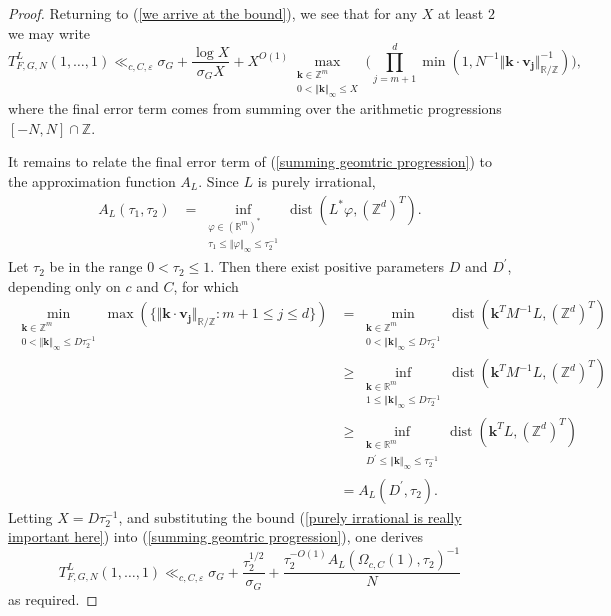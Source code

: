 \documentclass[12pt,a4paper,twoside,reqno]{amsart}
\newcommand{\dist}{\operatorname{dist}}
\numberwithin{equation}{section}
\begin{document}
\begin{proof}
Returning to (\ref{we arrive at the bound}), we see that for any $X$ at least $2$ we may write 
\begin{equation}
\label{summing geomtric progression}
T_{F,G,N}^L(1,\dots,1) \ll_{c,C,\varepsilon} \sigma_G + \frac{\log X}{\sigma_G X} + X^{O(1)}\max\limits_{\substack{\mathbf{k} \in \mathbb{Z}^m \\ 0<\Vert \mathbf{k} \Vert_\infty \leqslant X}}\Big( \prod\limits_{j=m+1}^d \min (1,  N^{-1}\Vert \mathbf{k} \cdot \mathbf{v_j}\Vert^{-1}_{\mathbb{R}/\mathbb{Z}})\Big),
\end{equation} where the final error term comes from summing over the arithmetic progressions $[-N,N] \cap \mathbb{Z}$.

It remains to relate the final error term of (\ref{summing geomtric progression}) to the approximation function $A_L$. Since $L$ is purely irrational, 
\begin{align}
A_L(\tau_1,\tau_2) &=\inf\limits_{\substack{\varphi \in (\mathbb{R}^m)^*\\ \tau_1 \leqslant  \Vert \varphi \Vert_\infty \leqslant \tau_2^{-1}} } \dist (L^* \varphi, (\mathbb{Z}^d)^T )\nonumber.
\end{align}
\noindent Let $\tau_2$ be in the range $0 < \tau_2 \leqslant 1$. Then there exist positive parameters $D$ and $D^\prime$, depending only on $c$ and $C$, for which
\begin{align}
\label{purely irrational is really important here}
\min\limits_{\substack{ \mathbf{k} \in \mathbb{Z}^m \\ 0< \Vert \mathbf{k}\Vert_\infty \leqslant D\tau_2^{-1}}} \max( \{\Vert \mathbf{k}\cdot\mathbf{v_j}\Vert_{\mathbb{R}/\mathbb{Z}}: m+1\leqslant j\leqslant d\}) & = \min\limits_{\substack{ \mathbf{k} \in \mathbb{Z}^m \\ 0< \Vert \mathbf{k}\Vert_\infty \leqslant D\tau_2^{-1}}} \dist(\mathbf{k}^T M^{-1} L, (\mathbb{Z}^d)^T) \nonumber\\
& \geqslant \inf\limits_{\substack{ \mathbf{k} \in \mathbb{R}^m \\ 1\leqslant \Vert \mathbf{k}\Vert_\infty \leqslant D\tau_2^{-1}}} \dist(\mathbf{k}^T M^{-1} L, (\mathbb{Z}^d)^T) \nonumber \\
&\geqslant \inf\limits_{\substack{ \mathbf{k} \in \mathbb{R}^m \\ D^\prime \leqslant \Vert \mathbf{k}\Vert_\infty \leqslant \tau_2^{-1}}} \dist(\mathbf{k}^T L, (\mathbb{Z}^d)^T)\nonumber \\
& =  A_L(D^\prime, \tau_2).
\end{align}
\noindent Letting $X = D \tau_2^{-1}$, and substituting the bound (\ref{purely irrational is really important here}) into (\ref{summing geomtric progression}), one derives
\begin{equation*}
T_{F,G,N}^L(1,\dots,1) \ll_{c,C,\varepsilon} \sigma_G + \frac{\tau_2^{1/2}}{\sigma _G} +  \frac{\tau_2^{-O(1)}A_L(\Omega_{c,C}(1),\tau_2)^{-1}}{N}
\end{equation*}
\noindent as required.
\end{proof}
\end{document}
